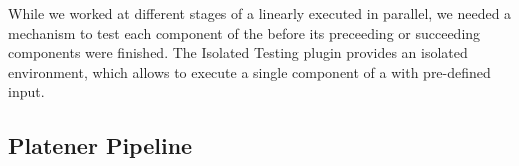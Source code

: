 \documentclass[../ClassicThesis.tex]{subfiles}
\begin{document}
While we worked at different stages of a linearly executed {\fabmethod} in
parallel, we needed a mechanism to test each component of the {\fabmethod}
before its preceeding or succeeding components were finished. The Isolated
Testing plugin provides an isolated environment, which allows to execute a
single component of a {\fabmethod} with pre-defined input.



\subsection{Platener Pipeline}
\end{document}
